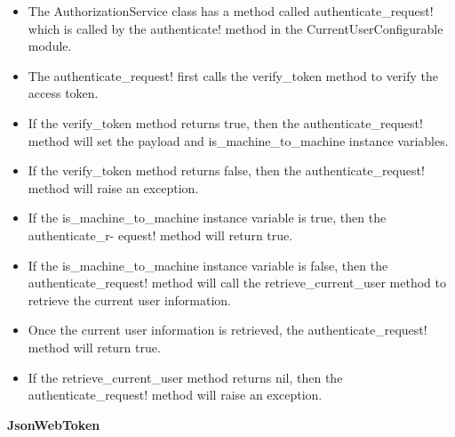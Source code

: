 \begin{justify}
            \begin{itemize}
                \item The AuthorizationService class has a method called authenticate\_request! which is called by the authenticate! method in the CurrentUserConfigurable module.
                \item The authenticate\_request! first calls the verify\_token method to verify the access token.
                \item If the verify\_token method returns true, then the authenticate\_request! method will set the payload and is\_machine\_to\_machine instance variables.
                \item If the verify\_token method returns false, then the authenticate\_request! method will raise an exception.
                \item If the is\_machine\_to\_machine instance variable is true, then the authenticate\_r- equest! method will return true.
                \item If the is\_machine\_to\_machine instance variable is false, then the authenticate\_request! method will call the retrieve\_current\_user method to retrieve the current user information.
                \item Once the current user information is retrieved, the authenticate\_request! method will return true.
                \item If the retrieve\_current\_user method returns nil, then the authenticate\_request! method will raise an exception.\\
            \end{itemize}

        \clearpage
        \noindent\textbf{JsonWebToken}
        

\end{justify}
